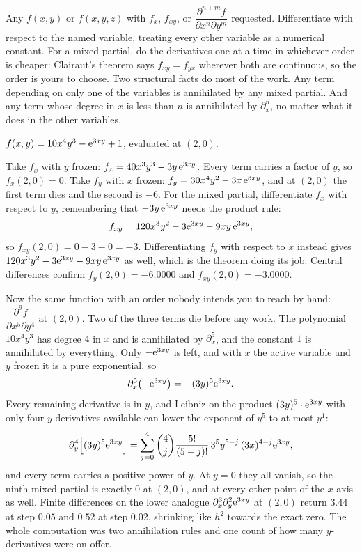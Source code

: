 \cue Any $f(x,y)$ or $f(x,y,z)$ with $f_{x}$, $f_{xy}$, or $\dfrac{\partial^{n+m}f}{\partial x^{n}\partial y^{m}}$ requested.
\method Differentiate with respect to the named variable, treating every other variable as a numerical constant. For a mixed partial, do the derivatives one at a time in whichever order is cheaper: Clairaut's theorem says $f_{xy}=f_{yx}$ wherever both are continuous, so the order is yours to choose. Two structural facts do most of the work. Any term depending on only one of the variables is annihilated by any mixed partial. And any term whose degree in $x$ is less than $n$ is annihilated by $\partial_{x}^{n}$, no matter what it does in the other variables.

\begin{worked}
$f(x,y)=10x^{4}y^{3}-\mathrm{e}^{3xy}+1$, evaluated at $(2,0)$.

Take $f_{x}$ with $y$ frozen: $f_{x}=40x^{3}y^{3}-3y\,\mathrm{e}^{3xy}$. Every term carries a factor of $y$, so $f_{x}(2,0)=0$. Take $f_{y}$ with $x$ frozen: $f_{y}=30x^{4}y^{2}-3x\,\mathrm{e}^{3xy}$, and at $(2,0)$ the first term dies and the second is $-6$. For the mixed partial, differentiate $f_{x}$ with respect to $y$, remembering that $-3y\,\mathrm{e}^{3xy}$ needs the product rule:
\[
f_{xy}=120x^{3}y^{2}-3\mathrm{e}^{3xy}-9xy\,\mathrm{e}^{3xy},
\]
so $f_{xy}(2,0)=0-3-0=-3$. Differentiating $f_{y}$ with respect to $x$ instead gives $120x^{3}y^{2}-3\mathrm{e}^{3xy}-9xy\,\mathrm{e}^{3xy}$ as well, which is the theorem doing its job. Central differences confirm $f_{y}(2,0)=-6.0000$ and $f_{xy}(2,0)=-3.0000$.

Now the same function with an order nobody intends you to reach by hand: $\dfrac{\partial^{9}f}{\partial x^{5}\partial y^{4}}$ at $(2,0)$. Two of the three terms die before any work. The polynomial $10x^{4}y^{3}$ has degree $4$ in $x$ and is annihilated by $\partial_{x}^{5}$, and the constant $1$ is annihilated by everything. Only $-\mathrm{e}^{3xy}$ is left, and with $x$ the active variable and $y$ frozen it is a pure exponential, so
\[
\partial_{x}^{5}\bigl(-\mathrm{e}^{3xy}\bigr)=-(3y)^{5}\mathrm{e}^{3xy}.
\]
Every remaining derivative is in $y$, and Leibniz on the product $(3y)^{5}\cdot\mathrm{e}^{3xy}$ with only four $y$-derivatives available can lower the exponent of $y^{5}$ to at most $y^{1}$:
\[
\partial_{y}^{4}\Bigl[(3y)^{5}\mathrm{e}^{3xy}\Bigr]
=\sum_{j=0}^{4}\binom{4}{j}\frac{5!}{(5-j)!}\,3^{5}y^{5-j}\,(3x)^{4-j}\mathrm{e}^{3xy},
\]
and every term carries a positive power of $y$. At $y=0$ they all vanish, so the ninth mixed partial is exactly $0$ at $(2,0)$, and at every other point of the $x$-axis as well. Finite differences on the lower analogue $\partial_{x}^{3}\partial_{y}^{2}\mathrm{e}^{3xy}$ at $(2,0)$ return $3.44$ at step $0.05$ and $0.52$ at step $0.02$, shrinking like $h^{2}$ towards the exact zero. The whole computation was two annihilation rules and one count of how many $y$-derivatives were on offer.
\end{worked}


